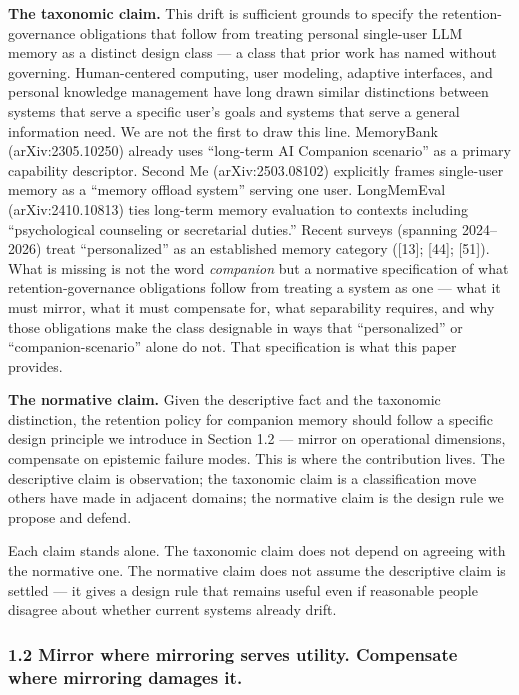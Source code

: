 \documentclass[
  11pt,
]{article}
\begin{document}
\textbf{The taxonomic claim.} This drift is sufficient grounds to
specify the retention-governance obligations that follow from treating
personal single-user LLM memory as a distinct design class --- a class
that prior work has named without governing. Human-centered computing,
user modeling, adaptive interfaces, and personal knowledge management
have long drawn similar distinctions between systems that serve a
specific user's goals and systems that serve a general information need.
We are not the first to draw this line. MemoryBank (arXiv:2305.10250)
already uses ``long-term AI Companion scenario'' as a primary capability
descriptor. Second Me (arXiv:2503.08102) explicitly frames single-user
memory as a ``memory offload system'' serving one user. LongMemEval
(arXiv:2410.10813) ties long-term memory evaluation to contexts
including ``psychological counseling or secretarial duties.'' Recent
surveys (spanning 2024--2026) treat ``personalized'' as an established
memory category ({[}13{]}; {[}44{]}; {[}51{]}). What is missing is not
the word \emph{companion} but a normative specification of what
retention-governance obligations follow from treating a system as one
--- what it must mirror, what it must compensate for, what separability
requires, and why those obligations make the class designable in ways
that ``personalized'' or ``companion-scenario'' alone do not. That
specification is what this paper provides.

\textbf{The normative claim.} Given the descriptive fact and the
taxonomic distinction, the retention policy for companion memory should
follow a specific design principle we introduce in Section 1.2 ---
mirror on operational dimensions, compensate on epistemic failure modes.
This is where the contribution lives. The descriptive claim is
observation; the taxonomic claim is a classification move others have
made in adjacent domains; the normative claim is the design rule we
propose and defend.

Each claim stands alone. The taxonomic claim does not depend on agreeing
with the normative one. The normative claim does not assume the
descriptive claim is settled --- it gives a design rule that remains
useful even if reasonable people disagree about whether current systems
already drift.

\hypertarget{mirror-where-mirroring-serves-utility.-compensate-where-mirroring-damages-it.}{%
\subsubsection{1.2 Mirror where mirroring serves utility. Compensate
where mirroring damages
it.}\label{mirror-where-mirroring-serves-utility.-compensate-where-mirroring-damages-it.}}
\end{document}
